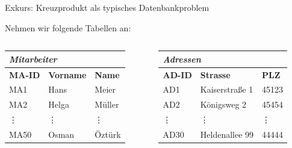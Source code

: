 \documentclass[12pt,ngerman,a4paper,ignorenonframetext,]{beamer}
\begin{document}
\begin{frame}{Exkurs: Kreuzprodukt als typisches Datenbankproblem}
\protect\hypertarget{exkurs-kreuzprodukt-als-typisches-datenbankproblem-1}{}


\begin{Beispiel}[]

\small

Nehmen wir folgende Tabellen an:

\vspace*{1em}

\begin{columns}
        \begin{column}{5cm}
            \begin{tabular}{|l|l|l|}
                \hline
                \multicolumn{3}{|l|}{{\it\bf Mitarbeiter}} \\
                \hline
                {\bf MA-ID} & {\bf Vorname} & {\bf Name} \\
                \hline
                MA1 & Hans  & Meier \\
                \hline
                MA2 & Helga & Müller    \\
                \hline
                \vdots & \vdots & \vdots \\
                \hline
                MA50 & Osman & Öztürk \\
                \hline
            \end{tabular}
        \end{column}
        \begin{column}{5cm}
            \begin{tabular}{|l|l|l|}
                \hline
                \multicolumn{3}{|l|}{{\it\bf Adressen}} \\
                \hline
                {\bf AD-ID} & {\bf Strasse} & {\bf PLZ} \\
                \hline
                AD1 & Kaiserstra{\ss}e 1    & 45123 \\
                \hline
                AD2 & Königsweg 2   & 45454 \\
                \hline
                \vdots & \vdots & \vdots \\
                \hline
                AD30 & Heldenallee 99 & 44444 \\
                \hline
            \end{tabular}
        \end{column}
\end{columns}


\end{Beispiel}
\end{frame}
\end{document}
